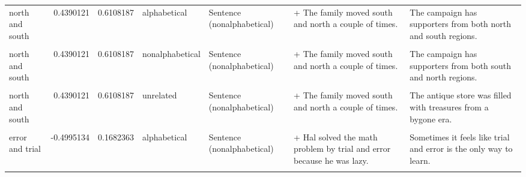 \documentclass[
  12pt,
]{scrartcl}
\begin{document}
\begin{landscape}
\begin{longtable}{lrrllll}
north and south & 0.4390121 & 0.6108187 & alphabetical & Sentence (nonalphabetical) & + The family moved south and north a couple of times. & The campaign has supporters from both north and south regions.\\
\addlinespace
\cellcolor{gray!6}{north and south} & \cellcolor{gray!6}{0.4390121} & \cellcolor{gray!6}{0.6108187} & \cellcolor{gray!6}{nonalphabetical} & \cellcolor{gray!6}{Sentence (alphabetical)} & \cellcolor{gray!6}{+ The family moved north and south a couple of times.} & \cellcolor{gray!6}{The campaign has supporters from both south and north regions.}\\
north and south & 0.4390121 & 0.6108187 & nonalphabetical & Sentence (nonalphabetical) & + The family moved south and north a couple of times. & The campaign has supporters from both south and north regions.\\
\cellcolor{gray!6}{north and south} & \cellcolor{gray!6}{0.4390121} & \cellcolor{gray!6}{0.6108187} & \cellcolor{gray!6}{unrelated} & \cellcolor{gray!6}{Sentence (alphabetical)} & \cellcolor{gray!6}{+ The family moved north and south a couple of times.} & \cellcolor{gray!6}{The antique store was filled with treasures from a bygone era.}\\
north and south & 0.4390121 & 0.6108187 & unrelated & Sentence (nonalphabetical) & + The family moved south and north a couple of times. & The antique store was filled with treasures from a bygone era.\\
\cellcolor{gray!6}{error and trial} & \cellcolor{gray!6}{-0.4995134} & \cellcolor{gray!6}{0.1682363} & \cellcolor{gray!6}{alphabetical} & \cellcolor{gray!6}{Sentence (alphabetical)} & \cellcolor{gray!6}{+ Hal solved the math problem by error and trial because he was lazy.} & \cellcolor{gray!6}{Sometimes it feels like trial and error is the only way to learn.}\\
\addlinespace
error and trial & -0.4995134 & 0.1682363 & alphabetical & Sentence (nonalphabetical) & + Hal solved the math problem by trial and error because he was lazy. & Sometimes it feels like trial and error is the only way to learn.\\
\cellcolor{gray!6}{error and trial} & \cellcolor{gray!6}{-0.4995134} & \cellcolor{gray!6}{0.1682363} & \cellcolor{gray!6}{nonalphabetical} & \cellcolor{gray!6}{Sentence (alphabetical)} & \cellcolor{gray!6}{+ Hal solved the math problem by error and trial because he was lazy.} & \cellcolor{gray!6}{Sometimes it feels like error and trial is the only way to learn.}\\

\end{longtable}
\end{landscape}
\end{document}
